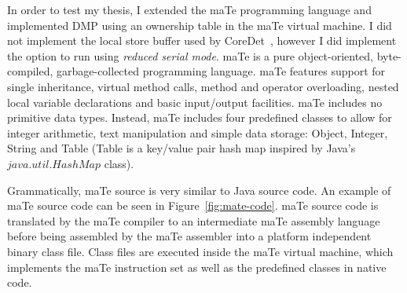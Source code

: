 In order to test my thesis, I extended the maTe programming language
and implemented DMP using an ownership table in the maTe virtual
machine.  I did not implement the local store buffer used by
CoreDet~\cite{coredet}, however I did implement the option to run
using \emph{reduced serial mode}.  maTe is a pure object-oriented,
byte-compiled, garbage-collected programming language.  maTe features
support for single inheritance, virtual method calls, method and
operator overloading, nested local variable declarations and basic
input/output facilities.  maTe includes no primitive data types.
Instead, maTe includes four predefined classes to allow for integer
arithmetic, text manipulation and simple data storage: Object,
Integer, String and Table (Table is a key/value pair hash map inspired
by Java's $java.util.HashMap$ class).

Grammatically, maTe source is very similar to Java source code.  An
example of maTe source code can be seen in Figure~\ref{fig:mate-code}.
maTe source code is translated by the maTe compiler to an intermediate
maTe assembly language before being assembled by the maTe assembler
into a platform independent binary class file.  Class files are
executed inside the maTe virtual machine, which implements the maTe
instruction set as well as the predefined classes in native code.

